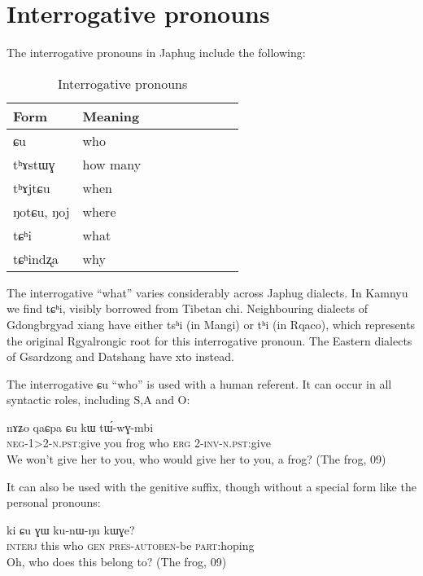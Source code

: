 \documentclass[oldfontcommands,oneside,a4paper,11pt]{memoir}
\newcommand{\ipa}[1]{{\phon #1}} %
\newcommand{\auto}{\textsc{autoben}}
\newcommand{\erg}{\textsc{erg}}
\newcommand{\gen}{\textsc{gen}}
\newcommand{\inv}{\textsc{inv}}
\newcommand{\negat}{\textsc{neg}}
\newcommand{\npst}{\textsc{n.pst}}
\newcommand{\pres}{\textsc{pres}}
\begin{document}
\section{Interrogative pronouns}
The interrogative pronouns in Japhug include the following:
\begin{table}[H] \centering
\caption{Interrogative pronouns }\label{tab:interrog.pronoun}
\begin{tabular}{lllllllll} \toprule
Form & Meaning   \\
\midrule
\ipa{ɕu} & who \\
\ipa{tʰɤstɯɣ} & how many \\
\ipa{tʰɤjtɕu} & when \\
\ipa{ŋotɕu}, \ipa{ŋoj} & where \\
\ipa{tɕʰi} & what \\
\ipa{tɕʰindʐa} & why \\
\bottomrule
\end{tabular}
\end{table}
The interrogative  ``what'' varies considerably across Japhug dialects. In Kamnyu we find \ipa{tɕʰi}, visibly borrowed from Tibetan \ipa{chi}. Neighbouring dialects of Gdongbrgyad xiang have either \ipa{tsʰi} (in Mangi) or \ipa{tʰi} (in Rqaco), which represents the original Rgyalrongic root for this interrogative pronoun. The Eastern dialects of Gsardzong and Datshang have \ipa{xto} instead.

The interrogative \ipa{ɕu} ``who'' is used with a human referent. It can occur in all syntactic roles, including S,A and O:
\begin{exe}
\ex
\gll  \ipa{mɤ-ta-mbi} 	\ipa{nɤʑo} 	\ipa{qaɕpa} 	\ipa{ɕu} 	\ipa{kɯ} 	\ipa{tɯ́-wɣ-mbi}    \\
 \negat{}-1>2-\npst{}:give you frog who \erg{} 2-\inv{}-\npst{}:give \\
\glt We won't give her to you, who would give her to you, a frog?   (The frog, 09)
\end{exe} 

It can also be used with the genitive suffix, though without a special form like the personal pronouns:
\begin{exe}
\ex
\gll  \ipa{χawo!} 	\ipa{ki} 	\ipa{ɕu} 	\ipa{ɣɯ} 	\ipa{ku-nɯ-ŋu} 	\ipa{kɯɣe?}    \\
 \textsc{interj} this who \gen{} \pres{}-\auto{}-be  \textsc{part}:hoping \\
\glt Oh, who does this belong to? (The frog, 09)
\end{exe}  
\end{document}
